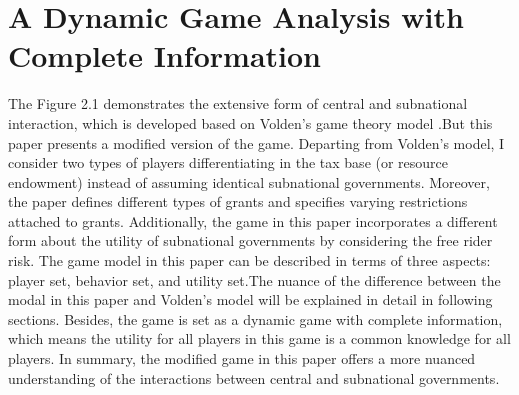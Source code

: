 \section{A Dynamic Game Analysis with Complete Information}
The Figure 2.1 demonstrates the extensive form of central and subnational interaction, which is developed based on Volden's game theory model \cite{volden2007intergovernmental}.But this paper presents a modified version of the game. Departing from Volden's model, I consider two types of players differentiating in the tax base (or resource endowment) instead of assuming identical subnational governments. Moreover, the paper defines different types of grants and specifies varying restrictions attached to grants. Additionally, the game in this paper incorporates a different form about the utility of subnational governments by considering the free rider risk. The game model in this paper can be described in terms of three aspects: player set, behavior set, and utility set.The nuance of the difference between the modal in this paper and Volden's model will be explained in detail in following sections. Besides, the game is set as a dynamic game with complete information, which means the utility for all players in this game is a common knowledge for all players. In summary, the modified game in this paper offers a more nuanced understanding of the interactions between central and subnational governments.

